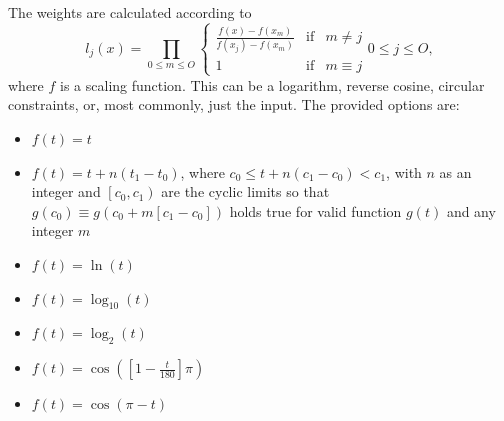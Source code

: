 The weights are calculated according to 
\begin{equation}
 l_j(x) = \prod_{0 \leq m \leq O} \left\{
 \begin{array}{lcr}
 \frac{f(x) - f(x _m)}{f(x_j) - f(x_m)} & \mathrm{if} & m \neq j \\[5pt]
 1 & \mathrm{if} & m \equiv j
 \end{array}
 \right. 0 \leq j \leq O, 
\end{equation}
where $f$ is a scaling function.  This can be a logarithm, reverse cosine,
circular constraints, or, most commonly, just the input.  The provided options
are:
\begin{itemize}
 \item[\shortcode{Linear}] $f\left(t\right) = t$
 \item[\shortcode{Cyclic}] $f\left(t\right) = t + n\left(t_1 - t_0\right)$,
                           where $c_0 \leq t + n\left(c_1 - c_0\right) < c_1$,
                           with $n$ as an integer and $\left[c_0, c_1\right)$
                           are the cyclic limits so that
                           $g\left(c_0\right) \equiv g\left(c_0 + m\left[c_1-c_0\right]\right)$
                           holds true for valid function $g(t)$ and any integer $m$
 \item[\shortcode{Log}] $f\left(t\right) = \ln\left(t\right)$
 \item[\shortcode{Log10}] $f\left(t\right) = \log_{10}\left(t\right)$
 \item[\shortcode{Log2}] $f\left(t\right) = \log_2\left(t\right)$
 \item[\shortcode{CosDeg}] $f\left(t\right) = \cos\left(\left[1 - \frac{t}{180}\right]\pi\right)$
 \item[\shortcode{CosRad}] $f\left(t\right) = \cos\left(\pi-t\right)$
\end{itemize}


